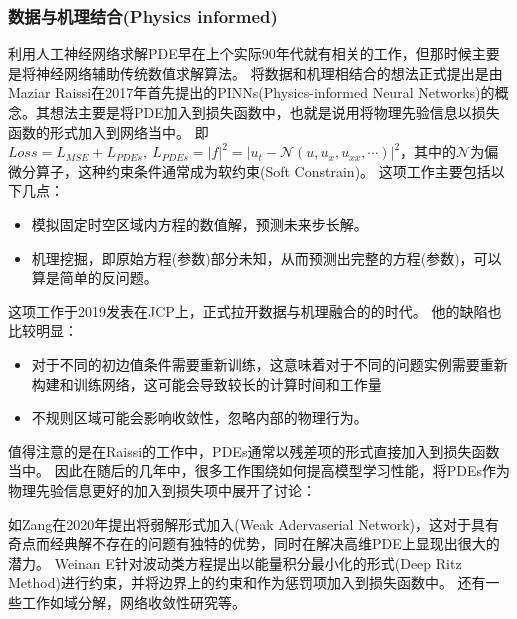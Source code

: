 \subsubsection{数据与机理结合(Physics informed)}
利用人工神经网络求解PDE早在上个实际90年代就有相关的工作，但那时候主要是将神经网络辅助传统数值求解算法\cite{NEURAL-NETWORK-BASED-APPROXIMATIONS1994}。
将数据和机理相结合的想法正式提出是由Maziar Raissi在2017年首先提出的PINNs(Physics-informed Neural Networks)\cite{RAISSI2019686}的概念。其想法主要是将PDE加入到损失函数中，也就是说用将物理先验信息以损失函数的形式加入到网络当中。
即$Loss=L_{MSE}+L_{PDEs},\ L_{PDEs}=|f|^2=\left|u_t-\mathscr{N}(u, u_x, u_{xx},\cdots)\right|^2$，其中的$\mathscr{N}$为偏微分算子，这种约束条件通常成为软约束(Soft Constrain)。
这项工作主要包括以下几点：
\begin{itemize}
    \item 模拟固定时空区域内方程的数值解，预测未来步长解。
    \item 机理挖掘，即原始方程(参数)部分未知，从而预测出完整的方程(参数)，可以算是简单的反问题。
\end{itemize}
这项工作于2019发表在JCP上，正式拉开数据与机理融合的的时代。
他的缺陷也比较明显：

\begin{itemize}
    \item 对于不同的初边值条件需要重新训练，这意味着对于不同的问题实例需要重新构建和训练网络，这可能会导致较长的计算时间和工作量
    \item 不规则区域可能会影响收敛性，忽略内部的物理行为。
\end{itemize}

值得注意的是在Raissi的工作中，PDEs通常以残差项的形式直接加入到损失函数当中。
因此在随后的几年中，很多工作围绕如何提高模型学习性能，将PDEs作为物理先验信息更好的加入到损失项中展开了讨论：

如Zang在2020年提出将弱解形式加入(Weak Adervaserial Network)\cite{ZANG_WAN}，这对于具有奇点而经典解不存在的问题有独特的优势，同时在解决高维PDE上显现出很大的潜力。
Weinan E针对波动类方程提出以能量积分最小化的形式(Deep Ritz Method)\cite{DRM}进行约束，并将边界上的约束和作为惩罚项加入到损失函数中。
还有一些工作如域分解，网络收敛性研究等。





